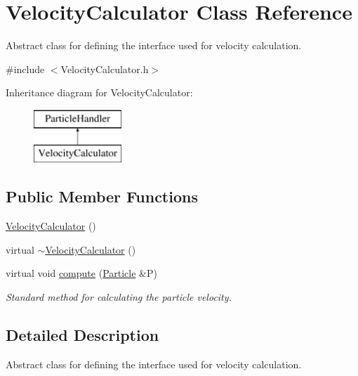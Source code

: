 \hypertarget{classVelocityCalculator}{\section{Velocity\-Calculator Class Reference}
\label{classVelocityCalculator}
}


Abstract class for defining the interface used for velocity calculation.  




{\ttfamily \#include $<$Velocity\-Calculator.\-h$>$}

Inheritance diagram for Velocity\-Calculator\-:\begin{figure}[H]
\begin{center}
\leavevmode
\includegraphics[height=2.000000cm]{classVelocityCalculator}
\end{center}
\end{figure}
\subsection*{Public Member Functions}
\begin{DoxyCompactItemize}
\item 
\hyperlink{classVelocityCalculator_a5bce81a668d56c8ed965687650c0cdfc}{Velocity\-Calculator} ()
\item 
virtual \hyperlink{classVelocityCalculator_ab47a91a39f722bdcca69fb6822730330}{$\sim$\-Velocity\-Calculator} ()
\item 
virtual void \hyperlink{classVelocityCalculator_a6094f69ee291570b9ad0eae4ad1dcbf8}{compute} (\hyperlink{classParticle}{Particle} \&P)
\begin{DoxyCompactList}\small\item\em Standard method for calculating the particle velocity. \end{DoxyCompactList}\end{DoxyCompactItemize}


\subsection{Detailed Description}
Abstract class for defining the interface used for velocity calculation. 

